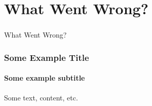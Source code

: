 \section[Wronglywent]{What Went Wrong?}

\begin{frame}
  \frametitle{}
  \begin{center}
    {\Huge What Went Wrong?}
  \end{center}
\end{frame}

\begin{frame}
    \frametitle{Some Example Title}
    \framesubtitle{Some example subtitle}
    \centering
    Some text, content, etc.
\end{frame}
